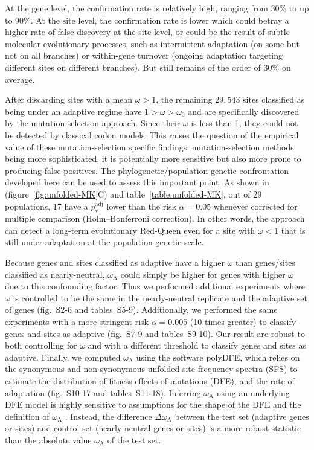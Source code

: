 \documentclass{article}
\newcommand{\rateApop}{\omega_{\mathrm{A}}}
\begin{document}
    At the gene level, the confirmation rate is relatively high, ranging from 30\% to up to 90\%.
    At the site level, the confirmation rate is lower which could betray a higher rate of false discovery at the site level, or could be the result of subtle molecular evolutionary processes, such as intermittent adaptation (on some but not on all branches) or within-gene turnover (ongoing adaptation targeting different sites on different branches).
    But still remains of the order of 30\% on average.

    After discarding sites with a mean $\omega > 1$, the remaining $29,543$ sites classified as being under an adaptive regime have $1 > \omega > \omega_{0}$ and are specifically discovered by the mutation-selection approach.
    Since their $\omega$ is less than 1, they could not be detected by classical codon models.
    This raises the question of the empirical value of these mutation-selection specific findings: mutation-selection methods being more sophisticated, it is potentially more sensitive but also more prone to producing false positives.
    The phylogenetic/population-genetic confrontation developed here can be used to assess this important point.
    As shown in (figure~\ref{fig:unfolded-MK}C) and table~\ref{table:unfolded-MK}, out of $29$ populations, $17$ have a $p_{\mathrm{v}}^{\mathrm{adj}}$ lower than the risk $\alpha=0.05$ whenever corrected for multiple comparison (Holm–Bonferroni correction).
    In other words, the approach can detect a long-term evolutionary Red-Queen even for a site with $\omega < 1$ that is still under adaptation at the population-genetic scale.

    Because genes and sites classified as adaptive have a higher $\omega$ than genes/sites classified as nearly-neutral, $\rateApop$ could simply be higher for genes with higher $\omega$ due to this confounding factor.
    Thus we performed additional experiments where $\omega$ is controlled to be the same in the nearly-neutral replicate and the adaptive set of genes (fig.~S2-6 and tables~S5-9).
    Additionally, we performed the same experiments with a more stringent risk $\alpha=0.005$ (10 times greater) to classify genes and sites as adaptive (fig.~S7-9 and tables~S9-10).
    Our result are robust to both controlling for $\omega$ and with a different threshold to classify genes and sites as adaptive.
    Finally, we computed $\rateApop$ using the software polyDFE\cite{tataru_polydfe_2020}, which relies on the synonymous and non-synonymous unfolded site-frequency spectra (SFS) to estimate the distribution of fitness effects of mutations (DFE), and the rate of adaptation (fig.~S10-17 and tables~S11-18).
    Inferring $\rateApop$ using an underlying DFE model is highly sensitive to assumptions for the shape of the DFE and the definition of $\rateApop$ .
    Instead, the difference $\Delta \rateApop$ between the test set (adaptive genes or sites) and control set (nearly-neutral genes or sites) is a more robust statistic than the absolute value $\rateApop$ of the test set.
\end{document}
